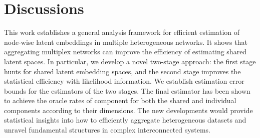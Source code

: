 \documentclass[12pt]{article}
\begin{document}







 
\section{Discussions} \label{sec:discussion}

This work establishes   
a general analysis framework for  efficient estimation of node-wise latent embeddings in multiple heterogeneous networks. 
It shows that aggregating multiplex networks can improve the efficiency of estimating shared latent spaces. 
In particular, we develop 
  a  novel two-stage approach: the first stage 
 hunts for shared latent embedding spaces,
and the second stage improves the statistical efficiency with likelihood information. 
We establish estimation error bounds for the estimators of the two stages. The final estimator has been shown to achieve the oracle rates of component for both the shared and individual components according to their dimensions.  
  The new developments would provide statistical insights into how to efficiently  aggregate heterogeneous datasets and unravel fundamental structures in complex interconnected systems. 
\end{document}
